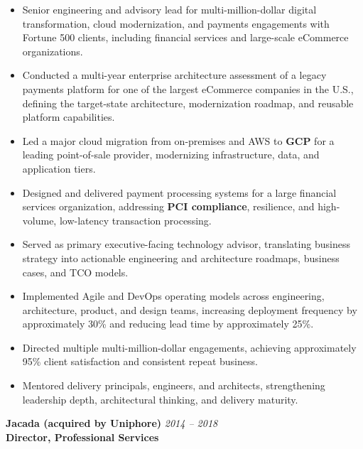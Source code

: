 \documentclass[11pt]{article}
\begin{document}
\begin{itemize}
  \item Senior engineering and advisory lead for multi-million-dollar digital transformation, cloud modernization, and payments engagements with Fortune 500 clients, including financial services and large-scale eCommerce organizations.
  \item Conducted a multi-year enterprise architecture assessment of a legacy payments platform for one of the largest eCommerce companies in the U.S., defining the target-state architecture, modernization roadmap, and reusable platform capabilities.
  \item Led a major cloud migration from on-premises and AWS to \textbf{GCP} for a leading point-of-sale provider, modernizing infrastructure, data, and application tiers.
  \item Designed and delivered payment processing systems for a large financial services organization, addressing \textbf{PCI compliance}, resilience, and high-volume, low-latency transaction processing.
  \item Served as primary executive-facing technology advisor, translating business strategy into actionable engineering and architecture roadmaps, business cases, and TCO models.
  \item Implemented Agile and DevOps operating models across engineering, architecture, product, and design teams, increasing deployment frequency by approximately 30\% and reducing lead time by approximately 25\%.
  \item Directed multiple multi-million-dollar engagements, achieving approximately 95\% client satisfaction and consistent repeat business.
  \item Mentored delivery principals, engineers, and architects, strengthening leadership depth, architectural thinking, and delivery maturity.
\end{itemize}

\vspace{6pt}

\textbf{Jacada (acquired by Uniphore)} \hfill \textit{2014 -- 2018} \\
\textbf{Director, Professional Services}
\end{document}
